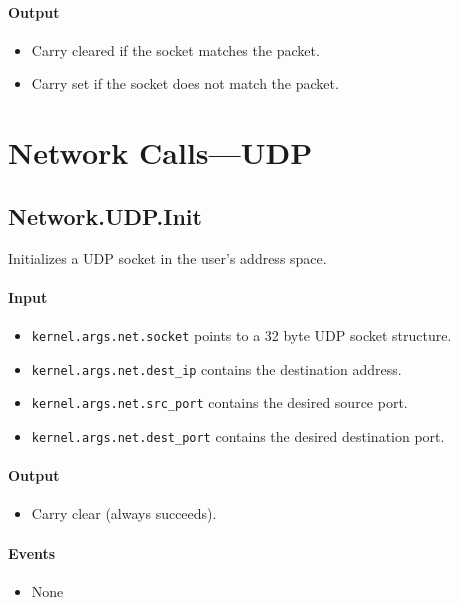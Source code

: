 \paragraph{Output}
\begin{itemize}
\item Carry cleared if the socket matches the packet.
\item Carry set if the socket does not match the packet.
\end{itemize}

\section*{Network Calls---UDP}

\subsection*{Network.UDP.Init}
Initializes a UDP socket in the user's address space.

\paragraph{Input}
\begin{itemize}
\item \verb+kernel.args.net.socket+ points to a 32 byte UDP socket structure.
\item \verb+kernel.args.net.dest_ip+ contains the destination address.
\item \verb+kernel.args.net.src_port+ contains the desired source port.
\item \verb+kernel.args.net.dest_port+ contains the desired destination port.
\end{itemize}

\paragraph{Output}
\begin{itemize}
\item Carry clear (always succeeds).
\end{itemize}

\paragraph{Events}
\begin{itemize}
\item None
\end{itemize}

